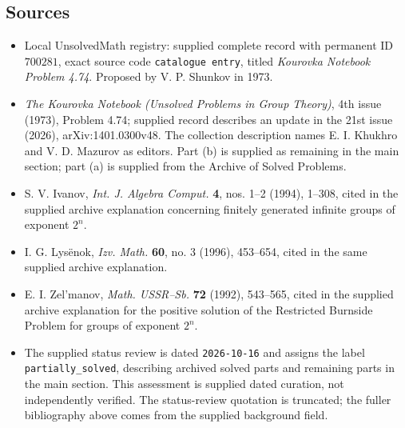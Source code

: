 \documentclass[11pt]{article}
\begin{document}
\subsection{Sources}
\begin{itemize}
\item Local UnsolvedMath registry: supplied complete record with permanent ID \(700281\), exact source code \texttt{catalogue entry}, titled \emph{Kourovka Notebook Problem 4.74}. Proposed by V. P. Shunkov in 1973.
\item \emph{The Kourovka Notebook (Unsolved Problems in Group Theory)}, 4th issue (1973), Problem 4.74; supplied record describes an update in the 21st issue (2026), arXiv:1401.0300v48. The collection description names E. I. Khukhro and V. D. Mazurov as editors. Part (b) is supplied as remaining in the main section; part (a) is supplied from the Archive of Solved Problems.
\item S. V. Ivanov, \emph{Int. J. Algebra Comput.} \textbf{4}, nos. 1--2 (1994), 1--308, cited in the supplied archive explanation concerning finitely generated infinite groups of exponent \(2^n\).
\item I. G. Lys\"enok, \emph{Izv. Math.} \textbf{60}, no. 3 (1996), 453--654, cited in the same supplied archive explanation.
\item E. I. Zel'manov, \emph{Math. USSR--Sb.} \textbf{72} (1992), 543--565, cited in the supplied archive explanation for the positive solution of the Restricted Burnside Problem for groups of exponent \(2^n\).
\item The supplied status review is dated \texttt{2026-10-16} and assigns the label \texttt{partially\_solved}, describing archived solved parts and remaining parts in the main section. This assessment is supplied dated curation, not independently verified. The status-review quotation is truncated; the fuller bibliography above comes from the supplied background field.
\end{itemize}
\end{document}

